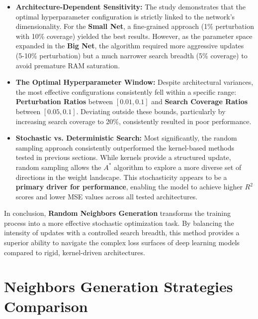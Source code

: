 \begin{itemize}
    \item \textbf{Architecture-Dependent Sensitivity:} The study demonstrates that the optimal hyperparameter configuration is strictly linked to the network's dimensionality. For the \textbf{Small Net}, a fine-grained approach (1\% perturbation with 10\% coverage) yielded the best results. However, as the parameter space expanded in the \textbf{Big Net}, the algorithm required more aggressive updates (5-10\% perturbation) but a much narrower search breadth (5\% coverage) to avoid premature RAM saturation.
    
    \item \textbf{The Optimal Hyperparameter Window:} Despite architectural variances, the most effective configurations consistently fell within a specific range: \textbf{Perturbation Ratios} between $[0.01, 0.1]$ and \textbf{Search Coverage Ratios} between $[0.05, 0.1]$. Deviating outside these bounds, particularly by increasing search coverage to 20\%, consistently resulted in poor performance.
    
    \item \textbf{Stochastic vs. Deterministic Search:} Most significantly, the random sampling approach consistently outperformed the kernel-based methods tested in previous sections. While kernels provide a structured update, random sampling allows the $A^*$ algorithm to explore a more diverse set of directions in the weight landscape. This stochasticity appears to be a \textbf{primary driver for performance}, enabling the model to achieve higher $R^2$ scores and lower MSE values across all tested architectures.
    \end{itemize}

In conclusion, \textbf{Random Neighbors Generation} transforms the training process into a more effective stochastic optimization task. By balancing the intensity of updates with a controlled search breadth, this method provides a superior ability to navigate the complex loss surfaces of deep learning models compared to rigid, kernel-driven architectures.

\newpage

\section{Neighbors Generation Strategies Comparison}
\label{sec:strategies_comparison}

